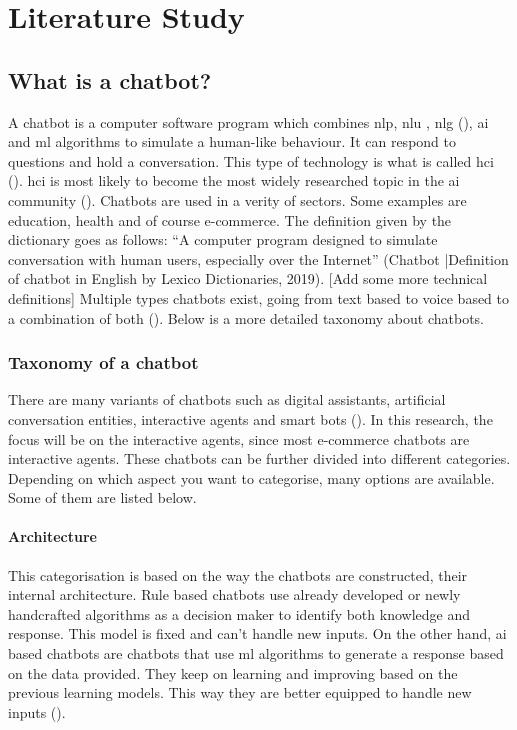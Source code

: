\mainmatter
\pagestyle{headings}

\chapter{Literature Study}
\label{ch:literature-study}

\section{What is a chatbot?}
A chatbot is a computer software program which combines \acrfull{nlp}, \acrfull{nlu} , \acrfull{nlg} (\cite{Adamopoulou2020}), \acrfull{ai} and \acrfull{ml} algorithms to simulate a human-like behaviour. It can respond to questions and hold a conversation. This type of technology is what is called \acrfull{hci} (\cite{Adamopoulou2020}).  \acrshort{hci} is most likely to become the most widely researched topic in the \acrshort{ai} community (\cite{Bansal2018}). Chatbots are used in a verity of sectors. Some examples are education, health and of course e-commerce.
\break
\break
The definition given by the dictionary goes as follows: “A computer program designed to simulate conversation with human users, especially over the Internet” (Chatbot |Definition of chatbot in English by Lexico Dictionaries, 2019). [Add some more technical definitions]
\break
\break
Multiple types chatbots exist, going from text based to voice based to a combination of both (\cite{Radziwil2021}). Below is a more detailed taxonomy about chatbots.

\subsection{Taxonomy of a chatbot}
There are many variants of chatbots such as digital assistants, artificial conversation entities, interactive agents and smart bots (\cite{Adamopoulou2020}). In this research, the focus will be on the interactive agents, since most e-commerce chatbots are interactive agents.
\break
\break
These chatbots can be further divided into different categories. Depending on which aspect you want to categorise, many options are available. Some of them are listed below.

\subsubsection{Architecture}
This categorisation is based on the way the chatbots are constructed, their internal architecture. Rule based chatbots use already developed or newly handcrafted algorithms as a decision maker to identify both knowledge and response. This model is fixed and can’t handle new inputs. On the other hand, \acrshort{ai} based chatbots are chatbots that use \acrlong{ml} algorithms to generate a response based on the data provided. They keep on learning and improving based on the previous learning models. This way they are better equipped to handle new inputs (\cite{Maroengsit2019}).

